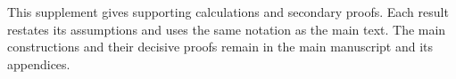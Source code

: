 \documentclass[11pt,letterpaper]{report}
\begin{document}
\hypersetup{pageanchor=false}
\hypersetup{pageanchor=true}
\tableofcontents
\bigskip
This supplement gives supporting calculations and secondary proofs. Each result restates its assumptions and uses the same notation as the main text. The main constructions and their decisive proofs remain in the main manuscript and its appendices.
\clearpage
{}






\end{document}
